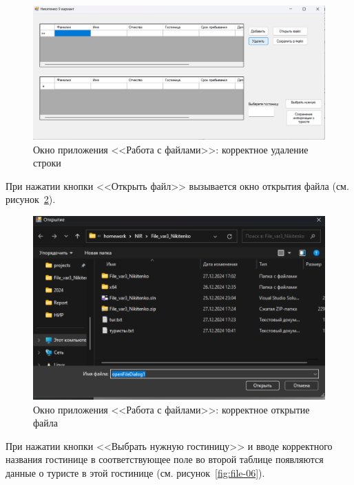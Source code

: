 \documentclass[bachelor, och, pract, times]{SCWorks}
\begin{document}
\begin{figure}[H]
    \centering
    \includegraphics[scale=0.45]{Скрины/Снимок экрана 2025-01-05 142205.png}
    \caption{Окно приложения <<Работа с файлами>>: корректное удаление строки}\label{fig:file-04}
\end{figure}

При нажатии кнопки <<Открыть файл>> вызывается окно открытия файла (см. рисунок~\ref{fig:file-05}).

\begin{figure}[H]
    \centering
    \includegraphics[scale=0.45]{Скрины/Снимок экрана 2025-01-05 142255.png}
    \caption{Окно приложения <<Работа с файлами>>: корректное открытие файла}\label{fig:file-05}
\end{figure}

При нажатии кнопки <<Выбрать нужную гостиницу>> и вводе корректного названия гостинице в соответствующее поле во второй таблице появляются данные о туристе в этой гостинице (см. рисунок~\ref{fig:file-06}).
\end{document}
